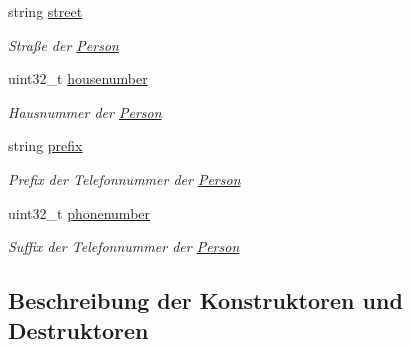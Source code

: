 \begin{DoxyCompactItemize}
string \hyperlink{classContactManager_1_1Person_aa406cf31ed8b781704ea91aa2efded51}{street}
\begin{DoxyCompactList}\small\item\em Straße der \hyperlink{classContactManager_1_1Person}{Person}\end{DoxyCompactList}\item 
uint32\+\_\+t \hyperlink{classContactManager_1_1Person_a8d5ff4192378dbfade263defa5b0198b}{housenumber}
\begin{DoxyCompactList}\small\item\em Hausnummer der \hyperlink{classContactManager_1_1Person}{Person}\end{DoxyCompactList}\item 
string \hyperlink{classContactManager_1_1Person_afdfe473856f60b61dea2bc1fdabeafd4}{prefix}
\begin{DoxyCompactList}\small\item\em Prefix der Telefonnummer der \hyperlink{classContactManager_1_1Person}{Person}\end{DoxyCompactList}\item 
uint32\+\_\+t \hyperlink{classContactManager_1_1Person_afc600ce59bcb61e62e90db8eeaad398b}{phonenumber}
\begin{DoxyCompactList}\small\item\em Suffix der Telefonnummer der \hyperlink{classContactManager_1_1Person}{Person}\end{DoxyCompactList}\end{DoxyCompactItemize}


\subsection{Beschreibung der Konstruktoren und Destruktoren}
\mbox{\label{classContactManager_1_1Person_a7e15c64ecd91d9fe3a86089296a96119}} 
